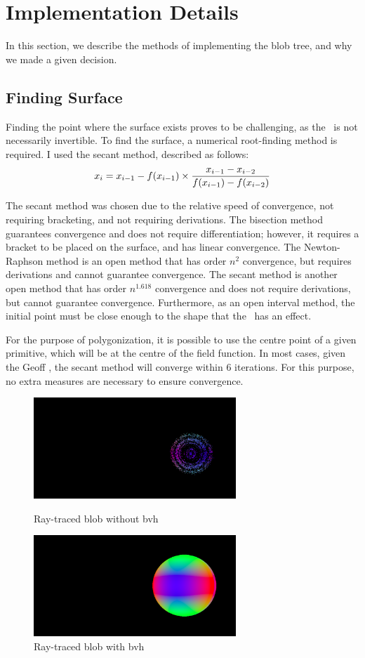 \documentclass[conference]{acmsiggraph}
\begin{document}
\section{Implementation Details}
In this section, we describe the methods of implementing the blob tree, and why
we made a given decision.


\subsection{Finding Surface}
Finding the point where the surface exists proves to be challenging, as the
\fff\ is not necessarily invertible. To find the surface, a numerical
root-finding method is required. I used the secant method, described as
follows:
\begin{equation}
x_i = x_{i-1} - f(x_{i-1}) \times {x_{i-1} - x_{i-2} \over f(x_{i-1}) -
f(x_{i-2})}
\label{eq:SecantMethod}
\end{equation}

The secant method was chosen due to the relative speed of convergence, not
requiring bracketing, and not requiring derivations. The bisection method
guarantees convergence and does not require differentiation; however, it
requires a bracket to be placed on the surface, and has linear convergence. The
Newton-Raphson method is an open method that has order $n^2$ convergence, but
requires derivations and cannot guarantee convergence. The secant method is
another open method that has order $n^{1.618}$ convergence and does not require
derivations, but cannot guarantee convergence. Furthermore, as an open interval
method, the initial point must be close enough to the shape that the \fff\ has
an effect.

For the purpose of polygonization, it is possible to use the centre point of a
given primitive, which will be at the centre of the field function. In most
cases, given the Geoff \fff, the secant method will converge within 6
iterations. For this purpose, no extra measures are necessary to ensure
convergence.

\begin{figure}[htb]
	\centering
	\includegraphics[height=1.5in] {images/sphere_no_bvh.png}
	\caption{Ray-traced blob without bvh}
	\includegraphics[height=1.5in] {images/sphere_bvh.png}
	\caption{Ray-traced blob with bvh}
\end{figure}
\end{document}
